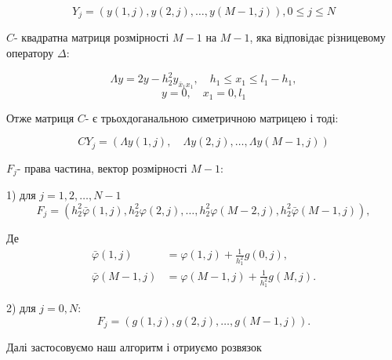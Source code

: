 $$ Y_j = (y(1, j), y(2, j), \dots , y(M-1, j)), 0\le j \le N $$

$C$- квадратна матриця розмірності $M-1$ на $M-1$, 
яка відповідає різницевому оператору $\Delta$:

$$\Lambda y =2 y-h_2^2 y_{\bar{x}_1 x_1}, \quad h_1 \le x_1 \le l_1-h_1,$$ 
$$y =0, \quad x_1=0, l_1$$

Отже матриця $C$- є трьохдоганальною симетричною матрицею і тоді:


$$CY_j=(\Lambda y(1, j), \quad \Lambda y(2, j), \ldots, \Lambda y(M-1, j))$$


$F_j$- права частина, вектор розмірності $M-1$: 



1) для $j = 1, 2, \dots, N-1$
$$F_j=\left(h_2^2 \bar{\varphi}(1, j), h_2^2 \varphi(2, j), \ldots, h_2^2 \varphi(M-2, j), h_2^2 \bar{\varphi}(M-1, j)\right),$$


Де 
$$\begin{aligned} \bar{\varphi}(1, j) & =\varphi(1, j)+\frac{1}{h_1^2} g(0, j), \\ \bar{\varphi}(M-1, j) & =\varphi(M-1, j)+\frac{1}{h_1^2} g(M, j) .\end{aligned}$$


2) для $j = 0, N$:
$$F_j=(g(1, j), g(2, j), \ldots, g(M-1, j)).$$

Далі застосовуємо наш алгоритм і отриуємо розвязок
